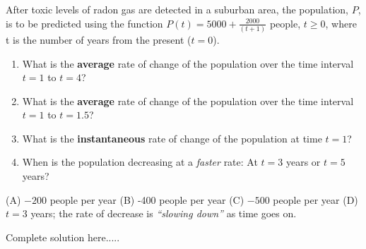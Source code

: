 \begin{example}
After toxic levels of radon gas are detected in a suburban area, the population, $P$, is to be predicted using the function 
$P(t)=5000+\displaystyle\frac{2000}{(t+1)}$ people, $t\ge 0$, where t is the number of years from the present ($t=0$).  
\renewcommand{\labelenumi}{(\Alph{enumi})}
\begin{enumerate}[leftmargin=*]
\item What is the \textbf{average} rate of change of the population over the time interval $t=1$ to $t=4$? \vspace{0.5in}
\item What is the \textbf{average} rate of change of the population over the time interval $t=1$ to $t=1.5$? \vspace{0.5in}
\item What is the \textbf{instantaneous} rate of change of the population at time $t=1$? \vspace{0.4in}
\item When is the population decreasing at a \emph{faster} rate:  At $t=3$ years or $t=5$ years? 
\end{enumerate}
    \begin{sol}
    (A) $-200$ people per year (B) -400 people per year (C) $-500$ people per year (D) $t=3$ years; the rate of decrease is \emph{“slowing down”} as time goes on.  
    \end{sol}
    \begin{solL}
    Complete solution here.....
    
    \end{solL}
    
\end{example}

